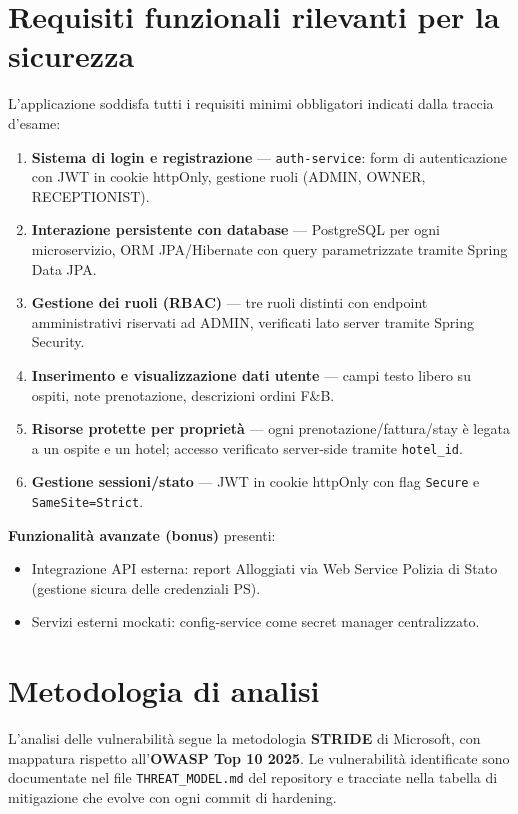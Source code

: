 ﻿\documentclass[a4paper,12pt]{report}
\begin{document}
\section{Requisiti funzionali rilevanti per la sicurezza}

L'applicazione soddisfa tutti i requisiti minimi obbligatori indicati dalla traccia d'esame:

\begin{enumerate}
  \item \textbf{Sistema di login e registrazione} — \texttt{auth-service}: form di autenticazione
        con JWT in cookie httpOnly, gestione ruoli (ADMIN, OWNER, RECEPTIONIST).
  \item \textbf{Interazione persistente con database} — PostgreSQL per ogni microservizio,
        ORM JPA/Hibernate con query parametrizzate tramite Spring Data JPA.
  \item \textbf{Gestione dei ruoli (RBAC)} — tre ruoli distinti con endpoint amministrativi
        riservati ad ADMIN, verificati lato server tramite Spring Security.
  \item \textbf{Inserimento e visualizzazione dati utente} — campi testo libero su ospiti,
        note prenotazione, descrizioni ordini F\&B.
  \item \textbf{Risorse protette per proprietà} — ogni prenotazione/fattura/stay è legata a
        un ospite e un hotel; accesso verificato server-side tramite \texttt{hotel\_id}.
  \item \textbf{Gestione sessioni/stato} — JWT in cookie httpOnly con flag \texttt{Secure}
        e \texttt{SameSite=Strict}.
\end{enumerate}

\textbf{Funzionalità avanzate (bonus)} presenti:
\begin{itemize}
  \item Integrazione API esterna: report Alloggiati via Web Service Polizia di Stato
        (gestione sicura delle credenziali PS).
  \item Servizi esterni mockati: config-service come secret manager centralizzato.
\end{itemize}

\section{Metodologia di analisi}

L'analisi delle vulnerabilità segue la metodologia \textbf{STRIDE} di Microsoft, con mappatura
rispetto all'\textbf{OWASP Top 10 2025}. Le vulnerabilità identificate sono documentate nel file
\texttt{THREAT\_MODEL.md} del repository e tracciate nella tabella di mitigazione che evolve
con ogni commit di hardening.
\end{document}
